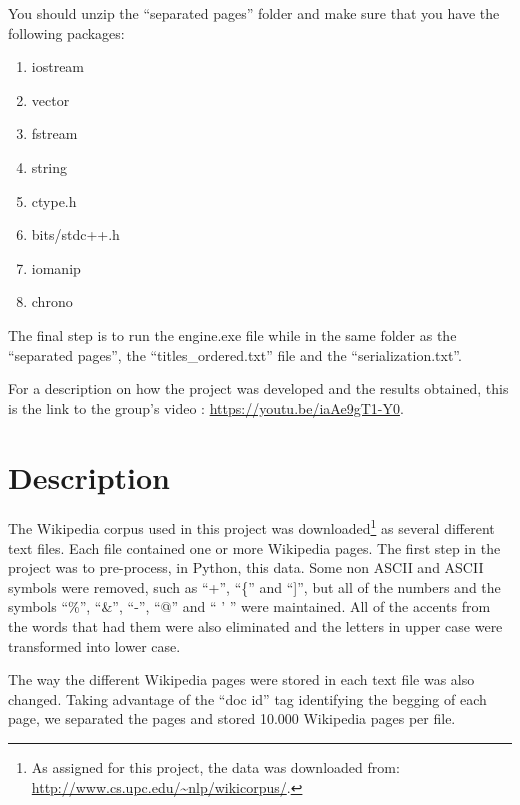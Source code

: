 \documentclass{article}
\begin{document}
You should unzip the ``separated pages'' folder and make sure that you have the following packages:
\begin{enumerate}
\item iostream
\item vector
\item fstream
\item string
\item ctype.h
\item bits/stdc++.h
\item iomanip
\item chrono
 \end{enumerate}


The final step is to run the engine.exe file while in the same folder as the  ``separated pages'', the ``titles\_ordered.txt'' file and the ``serialization.txt''.

For a description on how the project was developed and the results obtained, this is the link to the group's video : \url{https://youtu.be/iaAe9gT1-Y0}. 

\section*{Description}
The Wikipedia corpus used in this project was downloaded\footnote{As assigned for this project, the data was downloaded from: \url{http://www.cs.upc.edu/~nlp/wikicorpus/}.}  as several different text files. Each file contained one or more Wikipedia pages. The first step in the project was to pre-process, in Python, this data. Some non ASCII and ASCII symbols were removed, such as ``+'', ``\{'' and ``]'', but all of the numbers and the symbols ``\%'', ``\&'', ``-'', ``@'' and `` ' '' were maintained. All of the accents from the words that had them were also eliminated and the letters in upper case were transformed into lower case. 

The way the different Wikipedia pages were stored in each text file was also changed. Taking advantage of the ``doc id'' tag identifying the begging of each page, we separated the pages and stored 10.000 Wikipedia pages per file. 
\end{document}
